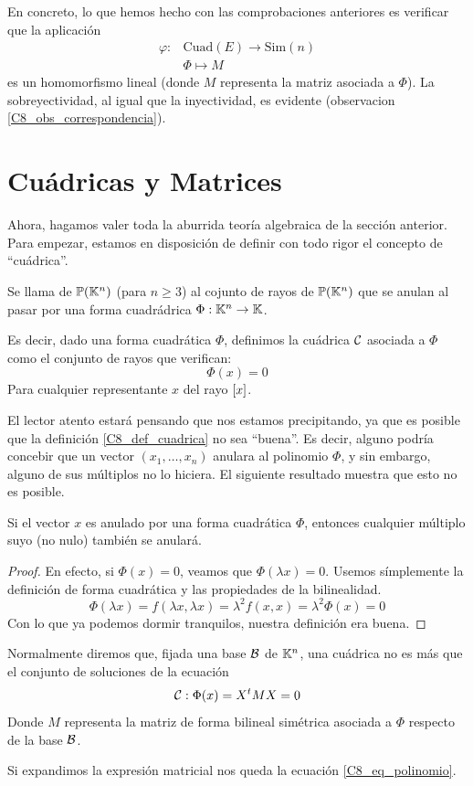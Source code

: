 En concreto, lo que hemos hecho con las comprobaciones anteriores es verificar que la aplicación
\[\begin{array}{cc}\varphi:&\mathrm{Cuad}(E)\to\mathrm{Sim}(n)\\&\Phi\mapsto M\end{array}\]
es un homomorfismo lineal (donde $M$ representa la matriz asociada a $\Phi$). La sobreyectividad, al igual que la inyectividad, es evidente (observacion \ref{C8_obs_correspondencia}).
\section{Cuádricas y Matrices}
Ahora, hagamos valer toda la aburrida teoría algebraica de la sección anterior. Para empezar, estamos en disposición de definir con todo rigor el concepto de ``cuádrica''.
\begin{defi}[Cuádrica]
	\label{C8_def_cuadrica}
	Se llama  de $\mathbb{P}(\mathbb{K}^n)$ (para $n\geq 3$) al cojunto de rayos de $\mathbb{P}(\mathbb{K}^n)$ que se anulan al pasar por una forma cuadrádrica $\Phi:\mathbb{K}^n\to\mathbb{K}$.
	
	Es decir, dado una forma cuadrática $\Phi$, definimos la cuádrica $\mathcal{C}$ asociada a $\Phi$ como el conjunto de rayos que verifican:
	\[\Phi(x)=0\]
	Para cualquier representante $x$ del rayo $\left [ x \right ]$.
\end{defi}
El lector atento estará pensando que nos estamos precipitando, ya que es posible que la definición \ref{C8_def_cuadrica} no sea ``buena''. Es decir, alguno podría concebir que un vector $(x_1,\dots,x_n)$ anulara al polinomio $\Phi$, y sin embargo, alguno de sus múltiplos no lo hiciera. El siguiente resultado muestra que esto no es posible.
\begin{lem}
	Si el vector $x$ es anulado por una forma cuadrática $\Phi$, entonces cualquier múltiplo suyo (no nulo) también se anulará.
\end{lem}
\begin{proof}
	En efecto, si $\Phi(x)=0$, veamos que $\Phi(\lambda x)=0$. Usemos símplemente la definición de forma cuadrática y las propiedades de la bilinealidad.
	\[\Phi(\lambda x)=f(\lambda x,\lambda x)=\lambda^2f(x,x)=\lambda^2\Phi(x)=0\]
	Con lo que ya podemos dormir tranquilos, nuestra definición era buena.
\end{proof}
\begin{obs}
	\label{C8_obs_ecuacionMatricial}
	Normalmente diremos que, fijada una base $\mathcal{B}$ de $\mathbb{K}^n$, una cuádrica no es más que el conjunto de soluciones de la ecuación
	\begin{equation}
		\mathcal{C}:\Phi(x)=X^tMX=0
	\end{equation}
	Donde $M$ representa la matriz de forma bilineal simétrica asociada a $\Phi$ respecto de la base $\mathcal{B}$.
	
	Si expandimos la expresión matricial nos queda la ecuación \eqref{C8_eq_polinomio}.
\end{obs}
